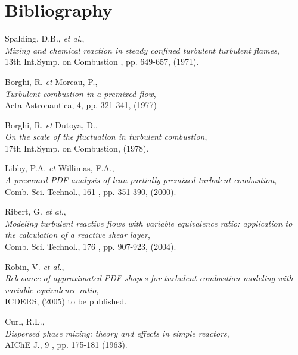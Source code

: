 \section{Bibliography}
\begin{thebibliography}{7}

{\sc Spalding, D.B., {\em et al.}},\\
{\em Mixing and chemical reaction in steady confined turbulent turbulent flames},\\
13th Int.Symp. on Combustion , pp. 649-657, (1971).

{\sc Borghi, R. {\em et } Moreau, P.},\\
{\em Turbulent combustion in a premixed flow},\\
Acta Astronautica, 4, pp. 321-341, (1977)

{\sc Borghi, R. {\em et } Dutoya, D.},\\
{\em On the scale of the fluctuation in turbulent combustion},\\
17th Int.Symp. on Combustion, (1978).

{\sc Libby, P.A. {\em et } Willimas, F.A.},\\
{\em A presumed PDF analysis of lean partially premixed turbulent combustion},\\
Comb. Sci. Technol., 161 , pp. 351-390, (2000).

{\sc Ribert, G. {\em et al.}},\\
{\em Modeling turbulent reactive flows with variable equivalence ratio: application to the calculation of a reactive shear layer},\\
Comb. Sci. Technol., 176 , pp. 907-923, (2004).

{\sc Robin, V. {\em et al.}},\\
{\em Relevance of approximated PDF shapes for turbulent combustion modeling with variable equivalence ratio},\\
ICDERS, (2005) to be published.

{\sc Curl, R.L.},\\
{\em Dispersed phase mixing: theory and effects in simple reactors},\\
AIChE J., 9 , pp. 175-181 (1963).




\end{thebibliography}
\newpage
